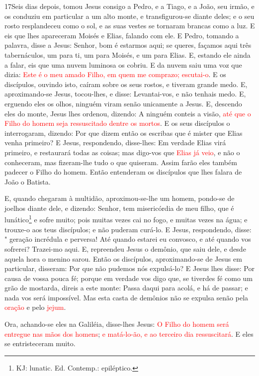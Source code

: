 \lettrine{17} Seis dias depois, tomou Jesus consigo a Pedro, e
a Tiago, e a João, seu irmão, e os conduziu em particular a um alto
monte, e transfigurou-se diante deles; e o seu rosto
resplandeceu como o sol, e as suas vestes se tornaram brancas como a
luz. E eis que lhes apareceram Moisés e Elias, falando com ele.
E Pedro, tomando a palavra, disse a Jesus: Senhor, bom é
estarmos aqui; se queres, façamos aqui três tabernáculos, um para
ti, um para Moisés, e um para Elias. E, estando ele ainda a
falar, eis que uma nuvem luminosa os cobriu. E da nuvem saiu uma voz
que dizia: \textcolor{red}{Este é o meu amado Filho, em quem me comprazo;
escutai-o}. E os discípulos, ouvindo isto, caíram sobre os seus
rostos, e tiveram grande medo. E, aproximando-se Jesus,
tocou-lhes, e disse: Levantai-vos, e não tenhais medo. E,
erguendo eles os olhos, ninguém viram senão unicamente a Jesus.
E, descendo eles do monte, Jesus lhes ordenou, dizendo: A
ninguém conteis a visão, \textcolor{red}{até que o Filho do homem seja
ressuscitado dentre os mortos}. E os seus discípulos o
interrogaram, dizendo: Por que dizem então os escribas que é mister
que Elias venha primeiro? E Jesus, respondendo, disse-lhes:
Em verdade Elias virá primeiro, e restaurará todas as coisas;
mas digo-vos que \textcolor{red}{Elias já veio}, e não o conheceram,
mas fizeram-lhe tudo o que quiseram. Assim farão eles também padecer
o Filho do homem. Então entenderam os discípulos que lhes
falara de João o Batista.

E, quando chegaram à multidão, aproximou-se-lhe um homem,
pondo-se de joelhos diante dele, e dizendo: Senhor, tem
misericórdia de meu filho, que é lunático\footnote{KJ: lunatic. Ed.
Contemp.: epiléptico.} e sofre muito; pois muitas vezes cai no fogo,
e muitas vezes na água; e trouxe-o aos teus discípulos; e não
puderam curá-lo. E Jesus, respondendo, disse: " geração
incrédula e perversa! Até quando estarei eu convosco, e até quando
vos sofrerei? Trazei-mo aqui. E, repreendeu Jesus o demônio,
que saiu dele, e desde aquela hora o menino sarou. Então os
discípulos, aproximando-se de Jesus em particular, disseram: Por que
não pudemos nós expulsá-lo? E Jesus lhes disse: Por causa de
vossa pouca fé; porque em verdade vos digo que, se tiverdes fé como
um grão de mostarda, direis a este monte: Passa daqui para acolá, e
há de passar; e nada vos será impossível. Mas esta casta de
demônios não se expulsa senão pela \textcolor{red}{oração} e pelo
\textcolor{red}{jejum}.

Ora, achando-se eles na Galiléia, disse-lhes Jesus: \textcolor{red}{O
Filho do homem será entregue nas mãos dos homens}; \textcolor{red}{e
matá-lo-ão, e ao terceiro dia ressuscitará}. E eles se entristeceram
muito.

